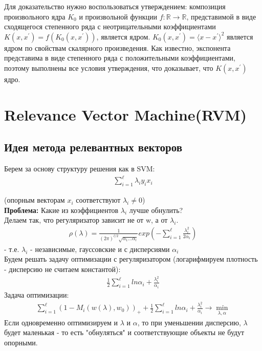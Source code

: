 Для доказательство нужно воспользоваться утверждением: композиция произвольного ядра $K_0$ и произвольной функции
$f: \mathbb{R} \rightarrow \mathbb{R}$, представимой в виде сходящегося степенного ряда с неотрицательными коэффициентами
$K\left(x, x^{\prime}\right)=f\left(K_0\left(x, x^{\prime}\right)\right)$, является ядром.
$K_0(x, x^{\prime}) = \langle x - x^{\prime} \rangle^2$ является ядром по свойствам скалярного произведения. Как известно,
экспонента представима в виде степенного ряда с положительными коэффициентами, поэтому выполнены все условия утверждения, что
доказывает, что $K(x, x^{\prime})$ ядро.


\section{Relevance Vector Machine(RVM)}

\subsection{Идея метода релевантных векторов}

Берем за основу структуру решения как в SVM:\\
\begin{align*}
   \sum_{i=1}^{\ell} \lambda_i y_i x_i
\end{align*}

(опорным векторам $x_i$ соответствуют $\lambda_i \neq 0$) \\
\textbf{Проблема:} Какие из коэффициентов $\lambda_i$ лучше обнулить? \\
Делаем так, что регуляризатор зависит не от w, а от $\lambda_i$. \\
\begin{align*}
       \rho (\lambda) = \frac{1}{(2\pi)^{l/2} \sqrt{\alpha_1...\alpha_l}} exp(-\sum_{i=1}^{\ell} \frac{\lambda_i^2}{2\alpha_i})
\end{align*}
- т.е. $\lambda_i$ - независимые, гауссовские и с дисперсиями $\alpha_i$ \\
Будем решать задачу оптимизации с регуляризатором (логарифмируем плотность - дисперсию не считаем константой): \\
\begin{align*}
       \frac{1}{2} \sum_{i=1}^{\ell} ln\alpha_i + \frac{\lambda_i^2}{\alpha_i}
\end{align*} 
Задача оптимизации:  \\
\begin{align*}
       \sum_{i=1}^{\ell} (1 - M_i(w(\lambda), w_0))_+ + \frac{1}{2} \sum_{i=1}^{\ell} ln\alpha_i + \frac{\lambda_i^2}{\alpha_i} \rightarrow \min_{\lambda, \alpha}
\end{align*}
Если одновременно оптимизируем и $\lambda$ и $\alpha$, то при уменьшении дисперсию, $\lambda$ будет маленькая - то есть "обнуляться" и соответствующие объекты не будут опорными. 

